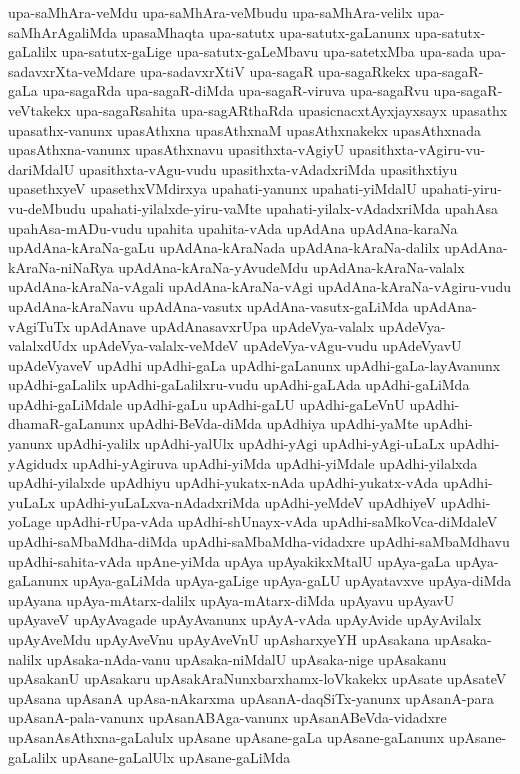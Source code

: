 {upa-saMhAra-veMdu
upa-saMhAra-veMbudu
upa-saMhAra-velilx
upa-saMhArAgaliMda
upasaMhaqta
upa-satutx
upa-satutx-gaLanunx
upa-satutx-gaLalilx
upa-satutx-gaLige
upa-satutx-gaLeMbavu
upa-satetxMba
upa-sada
upa-sadavxrXta-veMdare
upa-sadavxrXtiV
upa-sagaR
upa-sagaRkekx
upa-sagaR-gaLa
upa-sagaRda
upa-sagaR-diMda
upa-sagaR-viruva
upa-sagaRvu
upa-sagaR-veVtakekx
upa-sagaRsahita
upa-sagARthaRda
upasicnacxtAyxjayxsayx
upasathx
upasathx-vanunx
upasAthxna
upasAthxnaM
upasAthxnakekx
upasAthxnada
upasAthxna-vanunx
upasAthxnavu
upasithxta-vAgiyU
upasithxta-vAgiru-vu-dariMdalU
upasithxta-vAgu-vudu
upasithxta-vAdadxriMda
upasithxtiyu
upasethxyeV
upasethxVMdirxya
upahati-yanunx
upahati-yiMdalU
upahati-yiru-vu-deMbudu
upahati-yilalxde-yiru-vaMte
upahati-yilalx-vAdadxriMda
upahAsa
upahAsa-mADu-vudu
upahita
upahita-vAda
upAdAna
upAdAna-karaNa
upAdAna-kAraNa-gaLu
upAdAna-kAraNada
upAdAna-kAraNa-dalilx
upAdAna-kAraNa-niNaRya
upAdAna-kAraNa-yAvudeMdu
upAdAna-kAraNa-valalx
upAdAna-kAraNa-vAgali
upAdAna-kAraNa-vAgi
upAdAna-kAraNa-vAgiru-vudu
upAdAna-kAraNavu
upAdAna-vasutx
upAdAna-vasutx-gaLiMda
upAdAna-vAgiTuTx
upAdAnave
upAdAnasavxrUpa
upAdeVya-valalx
upAdeVya-valalxdUdx
upAdeVya-valalx-veMdeV
upAdeVya-vAgu-vudu
upAdeVyavU
upAdeVyaveV
upAdhi
upAdhi-gaLa
upAdhi-gaLanunx
upAdhi-gaLa-layAvanunx
upAdhi-gaLalilx
upAdhi-gaLalilxru-vudu
upAdhi-gaLAda
upAdhi-gaLiMda
upAdhi-gaLiMdale
upAdhi-gaLu
upAdhi-gaLU
upAdhi-gaLeVnU
upAdhi-dhamaR-gaLanunx
upAdhi-BeVda-diMda
upAdhiya
upAdhi-yaMte
upAdhi-yanunx
upAdhi-yalilx
upAdhi-yalUlx
upAdhi-yAgi
upAdhi-yAgi-uLaLx
upAdhi-yAgidudx
upAdhi-yAgiruva
upAdhi-yiMda
upAdhi-yiMdale
upAdhi-yilalxda
upAdhi-yilalxde
upAdhiyu
upAdhi-yukatx-nAda
upAdhi-yukatx-vAda
upAdhi-yuLaLx
upAdhi-yuLaLxva-nAdadxriMda
upAdhi-yeMdeV
upAdhiyeV
upAdhi-yoLage
upAdhi-rUpa-vAda
upAdhi-shUnayx-vAda
upAdhi-saMkoVca-diMdaleV
upAdhi-saMbaMdha-diMda
upAdhi-saMbaMdha-vidadxre
upAdhi-saMbaMdhavu
upAdhi-sahita-vAda
upAne-yiMda
upAya
upAyakikxMtalU
upAya-gaLa
upAya-gaLanunx
upAya-gaLiMda
upAya-gaLige
upAya-gaLU
upAyatavxve
upAya-diMda
upAyana
upAya-mAtarx-dalilx
upAya-mAtarx-diMda
upAyavu
upAyavU
upAyaveV
upAyAvagade
upAyAvanunx
upAyA-vAda
upAyAvide
upAyAvilalx
upAyAveMdu
upAyAveVnu
upAyAveVnU
upAsharxyeYH
upAsakana
upAsaka-nalilx
upAsaka-nAda-vanu
upAsaka-niMdalU
upAsaka-nige
upAsakanu
upAsakanU
upAsakaru
upAsakAraNunxbarxhamx-loVkakekx
upAsate
upAsateV
upAsana
upAsanA
upAsa-nAkarxma
upAsanA-daqSiTx-yanunx
upAsanA-para
upAsanA-pala-vanunx
upAsanABAga-vanunx
upAsanABeVda-vidadxre
upAsanAsAthxna-gaLalulx
upAsane
upAsane-gaLa
upAsane-gaLanunx
upAsane-gaLalilx
upAsane-gaLalUlx
upAsane-gaLiMda
}
